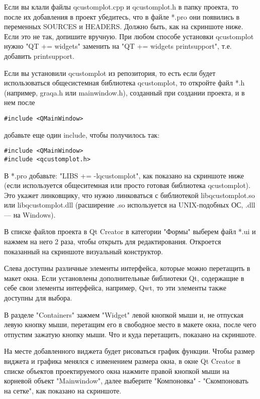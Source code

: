 Если вы клали файлы qcustomplot.cpp и qcustomplot.h в папку проекта, то после их добавления в проект убедитесь, что в файле *.pro они появились в переменных SOURCES и HEADERS. Должно быть, как на скриншоте ниже. Если это не так, допишите вручную. При любом способе установки qcustomplot нужно "QT += widgets" заменить на "QT += widgets printsupport", т.е. добавить printsupport.

Если вы установили qcustomplot из репозитория, то есть если будет использоваться общесистемная библиотека qcustomplot, то откройте файл *.h (например, graqa.h или mainwindow.h), созданный при создании проекта, и в нем после
\begin{verbatim}
#include <QMainWindow>
\end{verbatim}
добавьте еще один include, чтобы получилось так:
\begin{verbatim}
#include <QMainWindow>
#include <qcustomplot.h>
\end{verbatim}
В *.pro добавьте: "LIBS += -lqcustomplot", как показано на скриншоте ниже (если используется общеситемная или просто готовая библиотека qcustomplot). Это укажет линковщику, что нужно линковаться с библиотекой libqcustomplot.so или libqcustomplot.dll (расширение .so используется на UNIX-подобных ОС, .dll — на Windows).

В списке файлов проекта в Qt Creator в категории "Формы" выберем файл *.ui и нажмем на него 2 раза, чтобы открыть для редактирования. Откроется показанный на скриншоте визуальный конструктор.

Слева доступны различные элементы интерфейса, которые можно перетащить в макет окна. Если установлены дополнительные библиотеки Qt, содержащие в себе свои элементы интерфейса, например, Qwt, то эти элементы также доступны для выбора.

В разделе "Containers" зажмем "Widget" левой кнопкой мыши и, не отпуская левую кнопку мыши, перетащим его в свободное место в макете окна, после чего отпустим зажатую кнопку мыши. Что и куда перетащить, показано на скриншоте.

На месте добавленного виджета будет рисоваться график функции. Чтобы размер виджета и графика менялся с изменением размера окна, в окне Qt Creator в списке объектов проектируемого окна нажмите правой кнопкой мыши на корневой объект "Mainwindow", далее выберите "Компоновка" - "Скомпоновать на сетке", как показано на скриншоте.

